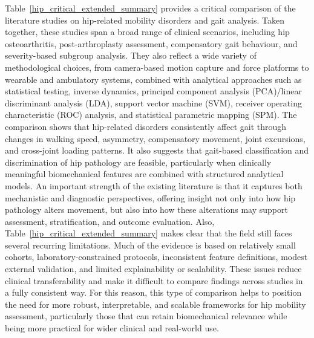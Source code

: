 \documentclass[12pt]{elsarticle}
\begin{document}
Table~\ref{hip_critical_extended_summary} provides a critical comparison of the literature studies on hip-related mobility disorders and gait analysis. Taken together, these studies span a broad range of clinical scenarios, including hip osteoarthritis, post-arthroplasty assessment, compensatory gait behaviour, and severity-based subgroup analysis. They also reflect a wide variety of methodological choices, from camera-based motion capture and force platforms to wearable and ambulatory systems, combined with analytical approaches such as statistical testing, inverse dynamics, principal component analysis (PCA)/linear discriminant analysis (LDA), support vector machine (SVM), receiver operating characteristic (ROC) analysis, and statistical parametric mapping (SPM). The comparison shows that hip-related disorders consistently affect gait through changes in walking speed, asymmetry, compensatory movement, joint excursions, and cross-joint loading patterns. It also suggests that gait-based classification and discrimination of hip pathology are feasible, particularly when clinically meaningful biomechanical features are combined with structured analytical models. An important strength of the existing literature is that it captures both mechanistic and diagnostic perspectives, offering insight not only into how hip pathology alters movement, but also into how these alterations may support assessment, stratification, and outcome evaluation. Also, Table~\ref{hip_critical_extended_summary} makes clear that the field still faces several recurring limitations. Much of the evidence is based on relatively small cohorts, laboratory-constrained protocols, inconsistent feature definitions, modest external validation, and limited explainability or scalability. These issues reduce clinical transferability and make it difficult to compare findings across studies in a fully consistent way. For this reason, this type of comparison helps to position the need for more robust, interpretable, and scalable frameworks for hip mobility assessment, particularly those that can retain biomechanical relevance while being more practical for wider clinical and real-world use.
\end{document}
